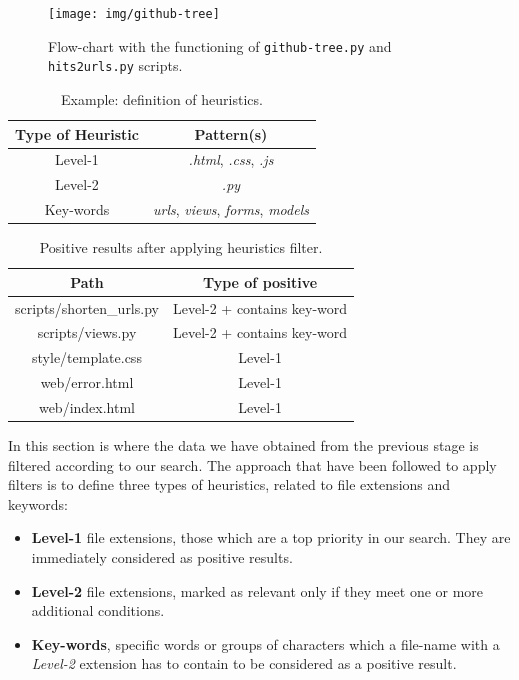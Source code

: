 \documentclass[a4paper, 12pt]{book}
\begin{document}
\begin{figure}
  \centering
  \texttt{[image: img/github-tree]}
  \caption{Flow-chart with the functioning of \texttt{github-tree.py} and \texttt{hits2urls.py} scripts.}
  \label{fig:gh-tree-diagram}
\end{figure}
\begin{table}[]
\centering
\caption{Example: definition of heuristics.}
\label{table:heuristics-table-example}
\begin{tabular}{|c|c|}
\hline
\textbf{Type of Heuristic} & \textbf{Pattern(s)}                                            \\ \hline
Level-1                    & \textit{.html}, \textit{.css}, \textit{.js}                    \\ \hline
Level-2                    & \textit{.py}                                                   \\ \hline
Key-words                  & \textit{urls}, \textit{views}, \textit{forms}, \textit{models} \\ \hline
\end{tabular}
\end{table}
\begin{table}[]
\centering
\caption{Positive results after applying heuristics filter.}
\label{table:heuristics-positive-example}
\begin{tabular}{|c|c|}
\hline
\textbf{Path}              & \textbf{Type of positive}   \\ \hline
scripts/shorten\_urls.py & Level-2 + contains key-word \\ \hline
scripts/views.py           & Level-2 + contains key-word \\ \hline
style/template.css         & Level-1                     \\ \hline
web/error.html             & Level-1                     \\ \hline
web/index.html             & Level-1                     \\ \hline
\end{tabular}
\end{table}
In this section is where the data we have obtained from the previous stage is filtered according to our search.
The approach that have been followed to apply filters is to define three types of heuristics, related to
file extensions and keywords:
\begin{itemize}
  \item \textbf{Level-1} file extensions, those which are a top priority in our search. They are immediately considered
   as positive results.
  \item \textbf{Level-2} file extensions, marked as relevant only if they meet one or more additional conditions.
  \item \textbf{Key-words}, specific words or groups of characters which a file-name with a \textit{Level-2} extension
  has to contain to be considered as a positive result.
\end{itemize}
\end{document}
